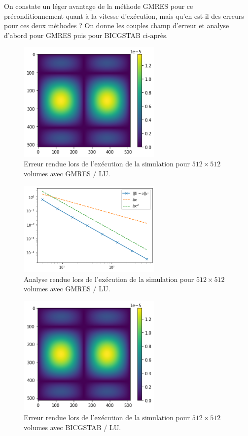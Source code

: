 On constate un léger avantage de la méthode GMRES pour ce préconditionnement quant à la vitesse d'exécution, mais qu'en est-il des erreurs pour ces deux méthodes ? On donne les couples champ d'erreur et analyse d'abord pour GMRES puis pour BICGSTAB ci-après.

\begin{figure}[htp]
    \centering
    \includegraphics[width=7cm]{Images/preliminaires/Laplace Dirichlet 2D creux GMRES Precond/erreurLU.png}
    \caption{Erreur rendue lors de l'exécution de la simulation pour $512 \times 512$ volumes avec GMRES / LU.}
\end{figure}

\begin{figure}[htp]
    \centering
    \includegraphics[width=7cm]{Images/preliminaires/Laplace Dirichlet 2D creux GMRES Precond/analyseLU.png}
    \caption{Analyse rendue lors de l'exécution de la simulation pour $512 \times 512$ volumes avec GMRES / LU.}
    \label{fig:creuxLaplacien2DGMRESPrecondLU}
\end{figure}

\begin{figure}[htp]
    \centering
    \includegraphics[width=7cm]{Images/preliminaires/Laplace Dirichlet 2D creux BICGSTAB Precond/erreurLU.png}
    \caption{Erreur rendue lors de l'exécution de la simulation pour $512 \times 512$ volumes avec BICGSTAB / LU.}
\end{figure}

